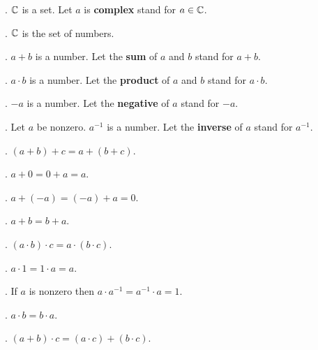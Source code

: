 \begin{signature}.
${\Bbb C}$ is a set. Let $a$ is {\bf complex} stand for $a \in {\Bbb C}$.
\end{signature}

\begin{axiom}.
${\Bbb C}$ is the set of numbers.
\end{axiom}

\begin{signature}.
$a + b$ is a number. Let the {\bf sum} of $a$ and $b$ stand for $a + b$.
\end{signature}

\begin{signature}.
$a \cdot b$ is a number. Let the {\bf product} of $a$ and $b$ stand for $a \cdot b$.
\end{signature}

\begin{signature}.
$-a$ is a number. Let the {\bf negative} of $a$ stand for $-a$.
\end{signature}

\begin{signature}.
Let $a$ be nonzero. $a^{-1}$ is a number. Let the {\bf inverse}
of $a$ stand for $a^{-1}$.
\end{signature}

\begin{axiom}.
$(a+b)+c = a+(b+c)$.
\end{axiom}
\begin{axiom}.
$a+0 = 0+a = a$.
\end{axiom}
\begin{axiom}.
$a+(-a) = (-a)+a=0$.
\end{axiom}
\begin{axiom}.
$a+b = b+a$.
\end{axiom}
\begin{axiom}.
$(a \cdot b) \cdot c = a \cdot (b \cdot c)$.
\end{axiom}
\begin{axiom}.
$a \cdot 1 = 1 \cdot a = a$.
\end{axiom}
\begin{axiom}.
If $a$ is nonzero then $a \cdot a^{-1} = a^{-1} \cdot a = 1$.
\end{axiom}
\begin{axiom}.
$a \cdot b = b \cdot a$.
\end{axiom}
\begin{axiom}.
$(a + b) \cdot c = (a \cdot c) + (b \cdot c)$.
\end{axiom}

